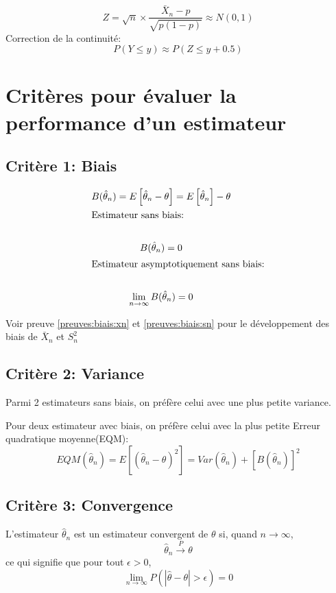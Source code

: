 \documentclass[]{book}
\theoremstyle{definition}
\theoremstyle{definition}
\theoremstyle{definition}
\theoremstyle{remark}
\begin{document}
\[
Z=\sqrt{n}\times \frac{\bar{X}_n-p}{\sqrt{p(1-p)}}\approx N(0,1)
\] Correction de la continuité: \[
P(Y\le y)\approx P(Z \le y+0.5 )
\]

\section{Critères pour évaluer la performance d'un
estimateur}\label{stats:criteres}

\subsection{Critère 1: Biais}\label{stats:criteres:biais}

\begin{gather*}
B(\hat{\theta}_n)= E\left[\hat{\theta}_n-\theta\right]=E\left[\hat{\theta}_n\right]-\theta\\
\intertext{Estimateur sans biais:}\\
B(\hat{\theta}_n)=0\\
\intertext{Estimateur asymptotiquement sans biais:}\\
\lim_{n\to \infty} B(\hat{\theta}_n)=0
\end{gather*}

Voir preuve \ref{preuves:biais:xn} et \ref{preuves:biais:sn} pour le
développement des biais de \(\bar{X}_n\) et \(S_n^2\)

\subsection{Critère 2: Variance}\label{stats:criteres:variance}

Parmi 2 estimateurs sans biais, on préfère celui avec une plus petite
variance.

Pour deux estimateur avec biais, on préfère celui avec la plus petite
Erreur quadratique moyenne(EQM): \[
EQM\left(\hat{\theta}_n\right)= E\left[(\hat{\theta}_n-\theta)^2\right]= Var\left(\hat{\theta}_n\right)+\left[B(\hat{\theta}_n)\right]^2
\]

\subsection{Critère 3: Convergence}\label{stats:convergence}

L'estimateur \(\hat{\theta}_n\) est un estimateur convergent de
\(\theta\) si, quand \(n\to \infty\), \[
\hat{\theta}_n\xrightarrow{P}\theta
\] ce qui signifie que pour tout \(\epsilon>0\), \[
\lim_{n\to\infty}P(|\hat{\theta}-\theta|>\epsilon)=0
\]
\end{document}
